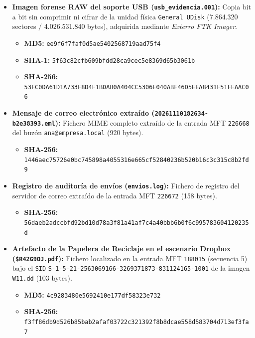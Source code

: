 \begin{itemize}[leftmargin=1.5em, itemsep=0.55em]
	\item \textbf{Imagen forense RAW del soporte USB (\texttt{usb\_evidencia.001}):} Copia bit a bit sin comprimir ni cifrar de la unidad física \texttt{General UDisk} (7.864.320 sectores / 4.026.531.840 bytes), adquirida mediante \textit{Exterro FTK Imager}.
	\begin{itemize}[leftmargin=1.2em]
		\item \textbf{MD5:} \texttt{ee9f6f7faf0d5ae5402568719aad75f4}
		\item \textbf{SHA-1:} \texttt{5f63c82cfb609bfdd28ca9cec5e8369d65b3061b}
		\item \textbf{SHA-256:} \texttt{53FC0DA61D1A733F8D4F1BDAB0A404CC5306E040ABF46D5EEA8431F51FEAAC06}
	\end{itemize}
	
	\item \textbf{Mensaje de correo electrónico extraído (\texttt{20261110182634-b2e38393.eml}):} Fichero MIME completo extraído de la entrada MFT \texttt{226668} del buzón \texttt{ana@empresa.local} (920 bytes).
	\begin{itemize}[leftmargin=1.2em]
		\item \textbf{SHA-256:} \texttt{1446aec75726e0bc745898a4055316e665cf52840236b520b16c3c315c8b2fd9}
	\end{itemize}
	
	\item \textbf{Registro de auditoría de envíos (\texttt{envios.log}):} Fichero de registro del servidor de correo extraído de la entrada MFT \texttt{226672} (158 bytes).
	\begin{itemize}[leftmargin=1.2em]
		\item \textbf{SHA-256:} \texttt{56daeb2adccbfd92bd10d78a3f81a41af7c4a40bbb6b0f6c995783604120235d}
	\end{itemize}
	
	\item \textbf{Artefacto de la Papelera de Reciclaje en el escenario Dropbox (\texttt{\$R42G9OJ.pdf}):} Fichero localizado en la entrada MFT \texttt{188015} (secuencia 5) bajo el \texttt{SID} \texttt{S-1-5-21-2563069166-3269371873-831124165-1001} de la imagen \texttt{W11.dd} (103 bytes).
	\begin{itemize}[leftmargin=1.2em]
		\item \textbf{MD5:} \texttt{4c9283480e5692410e177df58323e732}
		\item \textbf{SHA-256:} \texttt{f3ff86db9d526b85bab2afaf03722c321392f8b8dcae558d583704d713ef3fa7}
	\end{itemize}
	

\end{itemize}
